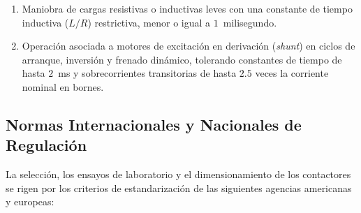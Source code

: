 \begin{enumerate}[label=\Alph*., leftmargin=0.6cm, font=\bfseries\color{black!60!black}, itemsep=0.5cm]
\begin{enumerate}[label=\textbf{\color{black}DC-\arabic*}:, leftmargin=1.5cm, itemsep=0.3cm, align=left]
        \item Maniobra de cargas resistivas o inductivas leves con una constante de tiempo inductiva ($L/R$) restrictiva, menor o igual a $1$~milisegundo.
        
        \item Operación asociada a motores de excitación en derivación (\textit{shunt}) en ciclos de arranque, inversión y frenado dinámico, tolerando constantes de tiempo de hasta $2$~ms y sobrecorrientes transitorias de hasta $2.5$ veces la corriente nominal en bornes.
        
    \end{enumerate}

\end{enumerate}

\subsection{Normas Internacionales y Nacionales de Regulación}

La selección, los ensayos de laboratorio y el dimensionamiento de los contactores se rigen por los criterios de estandarización de las siguientes agencias americanas y europeas:

